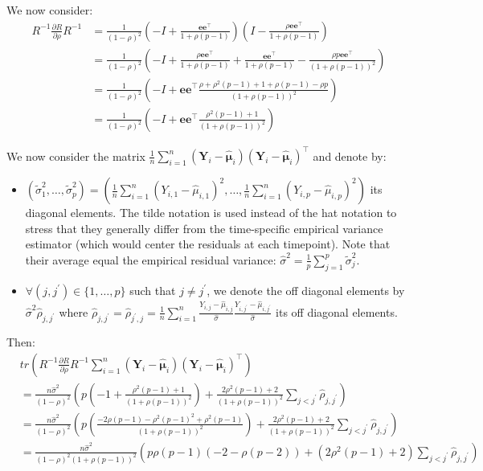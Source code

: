 \documentclass[12pt]{article}
\newcommand\Ve{\mathbf{e}}
\newcommand\VY{\mathbf{Y}}
\newcommand\Vmu{\boldsymbol{\mu}}
\newcommand\trans[1]{{#1}^\intercal}%
\begin{document}
We now consider:
\begin{align*}
R^{-1} \frac{\partial R}{\partial\rho} R^{-1} &= \frac{1}{(1-\rho)^2} \left(-I +  \frac{\Ve\trans{\Ve}}{1+\rho(p-1)}\right)\left(I - \frac{\rho \Ve\trans{\Ve}}{1+\rho(p-1)}\right) \\
&= \frac{1}{(1-\rho)^2} \left(-I + \frac{\rho \Ve\trans{\Ve}}{1+\rho(p-1)} + \frac{\Ve\trans{\Ve}}{1+\rho(p-1)} - \frac{\rho p \Ve\trans{\Ve}}{(1+\rho(p-1))^2}\right) \\
&= \frac{1}{(1-\rho)^2} \left(-I + \Ve\trans{\Ve} \frac{\rho+\rho^2(p-1) + 1+ \rho(p-1) - \rho p}{(1+\rho(p-1))^2}\right) \\
&= \frac{1}{(1-\rho)^2} \left(-I + \Ve\trans{\Ve} \frac{\rho^2(p-1) + 1}{(1+\rho(p-1))^2}\right) 
\end{align*}

We now consider the matrix \(\frac{1}{n}\sum_{i=1}^n (\VY_i-\widehat{\Vmu}_i)\trans{(\VY_i-\widehat{\Vmu}_i)}\) and denote by:
\begin{itemize}
\item \(\left(\widetilde{\sigma}^2_1,\ldots,\widetilde{\sigma}^2_p\right)=\left(\frac{1}{n}\sum_{i=1}^n
  (Y_{i,1}-\widehat{\mu}_{i,1})^2,\ldots,\frac{1}{n}\sum_{i=1}^n
  (Y_{i,p}-\widehat{\mu}_{i,p})^2\right)\) its diagonal elements. The tilde
notation is used instead of the hat notation to stress that they
generally differ from the time-specific empirical variance estimator
(which would center the residuals at each timepoint). Note that
their average equal the empirical residual variance:
\(\widehat{\sigma}^2 = \frac{1}{p} \sum_{j=1}^p
  \widetilde{\sigma}^2_j\).
\item \(\forall (j,j^{\prime})\in \{1,\ldots,p\}\) such that \(j \neq
  j^{\prime}\), we denote the off diagonal elements by
\(\widehat{\sigma}^2\widehat{\rho}_{j,j^{\prime}}\) where
\(\widehat{\rho}_{j,j^{\prime}} = \widehat{\rho}_{j^{\prime},j} =
  \frac{1}{n}\sum_{i=1}^n \frac{Y_{i,j}-\widehat{\mu}_{i,j}}{\widehat{\sigma}}
  \frac{Y_{i,j^{\prime}}-\widehat{\mu}_{i,j^{\prime}}}{\widehat{\sigma}}\) its
off diagonal elements.
\end{itemize}
Then:  
\begin{align*}
& tr \left( R^{-1} \frac{\partial R}{\partial\rho} R^{-1} \sum_{i=1}^n  (\VY_i-\widehat{\Vmu}_i)\trans{(\VY_i-\widehat{\Vmu}_i)} \right) \\
& = \frac{n\widehat{\sigma}^2}{(1-\rho)^2}\left(p\left(-1+\frac{\rho^2(p-1) + 1}{(1+\rho(p-1))^2}\right) + \frac{2\rho^2(p-1) + 2}{(1+\rho(p-1))^2} \sum_{j < j^{\prime}}\widehat{\rho}_{j,j^{\prime}}\right) \\
&= \frac{n\widehat{\sigma}^2}{(1-\rho)^2}\left(p\left(\frac{-2\rho(p-1)-\rho^2(p-1)^2+\rho^2(p-1)}{(1+\rho(p-1))^2}\right) + \frac{2\rho^2(p-1) + 2}{(1+\rho(p-1))^2} \sum_{j < j^{\prime}}\widehat{\rho}_{j,j^{\prime}}\right) \\
&= \frac{n\widehat{\sigma}^2}{(1-\rho)^2(1+\rho(p-1))^2}\left(p\rho(p-1)\left(-2-\rho (p-2)\right) + \left(2\rho^2(p-1) + 2\right) \sum_{j < j^{\prime}}\widehat{\rho}_{j,j^{\prime}}\right)
\end{align*}
\end{document}

